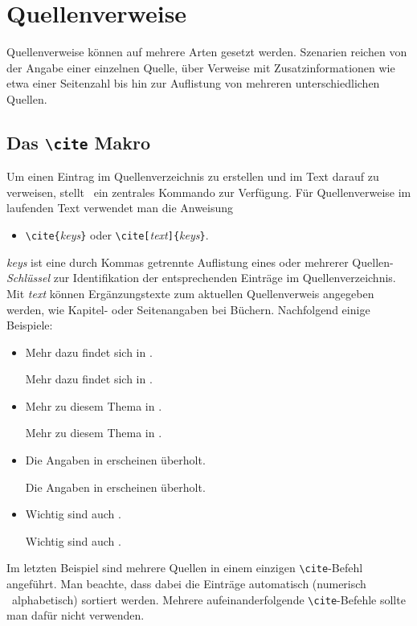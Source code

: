 \section{Quellenverweise}

Quellenverweise können auf mehrere Arten gesetzt werden. Szenarien reichen von
der Angabe einer einzelnen Quelle, über Verweise mit Zusatzinformationen wie
etwa einer Seitenzahl bis hin zur Auflistung von mehreren unterschiedlichen
Quellen.

\subsection{Das \texttt{\textbackslash cite} Makro}

Um einen Eintrag im Quellenverzeichnis zu erstellen und im Text darauf zu
verweisen, stellt \latex\ ein zentrales Kommando zur Verfügung.
Für Quellenverweise im laufenden Text verwendet man die Anweisung
%
\begin{itemize}
\item[] \verb!\cite{!\textit{keys}\verb!}!
				\quad oder \quad
        \verb!\cite[!\textit{text}\verb!]{!\textit{keys}\verb!}!.
\end{itemize}
%
\textit{keys} ist eine durch Kommas getrennte Auflistung eines oder mehrerer
Quellen-\emph{Schlüssel} zur Identifikation der entsprechenden Einträge im
Quellenverzeichnis. Mit \textit{text} können Ergänzungstexte zum aktuellen
Quellenverweis angegeben werden, wie \zB Kapitel- oder Seitenangaben bei
Büchern. Nachfolgend einige Beispiele:
%
\begin{itemize}
    \item Mehr dazu findet sich in \cite{Kopka2003}.
\begin{LaTeXCode}[numbers=none]
Mehr dazu findet sich in \cite{Kopka2003}.
\end{LaTeXCode}
%
    \item Mehr zu diesem Thema in \cite[Kap.~3]{Kopka2003}.
\begin{LaTeXCode}[numbers=none]
Mehr zu diesem Thema in \cite[Kap.~3]{Kopka2003}.
\end{LaTeXCode}
%
    \item Die Angaben in \cite[S.\ 274--277]{BurgeBurger1999} erscheinen überholt.
\begin{LaTeXCode}[numbers=none]
Die Angaben in \cite[S.\ 274--277]{BurgeBurger1999} erscheinen überholt.
\end{LaTeXCode}
%
    \item Wichtig sind auch \cite{Patashnik1988,Feder2006,Duden1997}.
\begin{LaTeXCode}[numbers=none]
Wichtig sind auch \cite{Patashnik1988,Feder2006,Duden1997}.
\end{LaTeXCode}
\end{itemize}
%
Im letzten Beispiel sind mehrere Quellen in einem einzigen
\texttt{\textbackslash cite}-Befehl angeführt. Man beachte, dass dabei die
Einträge automatisch (numerisch \bzw\ alphabetisch) sortiert werden. Mehrere
aufeinanderfolgende \texttt{\textbackslash cite}-Befehle sollte man dafür
nicht verwenden.

